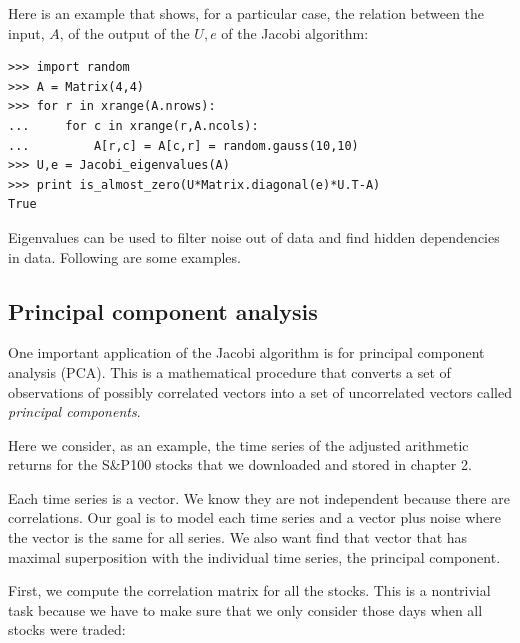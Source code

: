 \documentclass[justified,sixbynine]{tufte-book}
\def\ft{\small\tt}
\theoremstyle{plain}%
\theoremstyle{definition}
\theoremstyle{remark}
\begin{document}
\begin{fullwidth}
\begin{lstlisting}[caption={in file: {\ft nlib.py}}]
\end{lstlisting}

Here is an example that shows, for a particular case, the relation between the input, $A$, of the output of the $U,e$ of the Jacobi algorithm:

\begin{lstlisting}[caption={in file: {\ft nlib.py}}]
>>> import random
>>> A = Matrix(4,4)
>>> for r in xrange(A.nrows):
...     for c in xrange(r,A.ncols):
...         A[r,c] = A[c,r] = random.gauss(10,10)
>>> U,e = Jacobi_eigenvalues(A)
>>> print is_almost_zero(U*Matrix.diagonal(e)*U.T-A)
True
\end{lstlisting}

Eigenvalues can be used to filter noise out of data and find hidden dependencies in data. Following are some examples.

\goodbreak\subsection{Principal component analysis}


One important application of the Jacobi algorithm is for principal component analysis (PCA). This is a mathematical procedure that converts a set of observations of possibly correlated vectors into a set of uncorrelated vectors called {\it principal components}.

Here we consider, as an example, the time series of the adjusted arithmetic returns for the S\&P100 stocks that we downloaded and stored in chapter 2.

Each time series is a vector. We know they are not independent because there are correlations. Our goal is to model each time series and a vector plus noise where the vector is the same for all series. We also want find that vector that has maximal superposition with the individual time series, the principal component.

First, we compute the correlation matrix for all the stocks. This is a nontrivial task because we have to make sure that we only consider those days when all stocks were traded:


\end{fullwidth}
\end{document}
